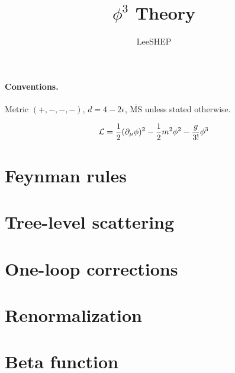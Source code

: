 \documentclass[11pt]{article}
\title{$\phi^3$ Theory}
\author{LeeSHEP}
\date{}
\begin{document}
\maketitle

\paragraph{Conventions.} Metric $(+,-,-,-)$, $d = 4 - 2\epsilon$, $\overline{\text{MS}}$ unless stated otherwise.

\begin{equation}
  \mathcal{L} = \frac{1}{2}(\partial_\mu\phi)^2 - \frac{1}{2}m^2\phi^2 - \frac{g}{3!}\phi^3
\end{equation}

\section{Feynman rules}
\section{Tree-level scattering}
\section{One-loop corrections}
\section{Renormalization}
\section{Beta function}
\end{document}

